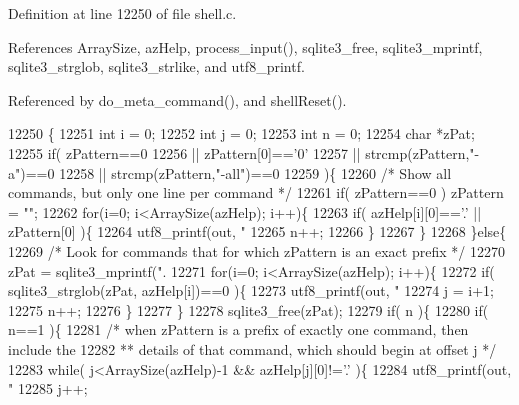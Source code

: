 Definition at line 12250 of file shell.\+c.



References Array\+Size, az\+Help, process\+\_\+input(), sqlite3\+\_\+free, sqlite3\+\_\+mprintf, sqlite3\+\_\+strglob, sqlite3\+\_\+strlike, and utf8\+\_\+printf.



Referenced by do\+\_\+meta\+\_\+command(), and shell\+Reset().


\begin{DoxyCode}
12250                                                     \{
12251   \textcolor{keywordtype}{int} i = 0;
12252   \textcolor{keywordtype}{int} j = 0;
12253   \textcolor{keywordtype}{int} n = 0;
12254   \textcolor{keywordtype}{char} *zPat;
12255   \textcolor{keywordflow}{if}( zPattern==0
12256    || zPattern[0]==\textcolor{charliteral}{'0'}
12257    || strcmp(zPattern,\textcolor{stringliteral}{"-a"})==0
12258    || strcmp(zPattern,\textcolor{stringliteral}{"-all"})==0
12259   )\{
12260     \textcolor{comment}{/* Show all commands, but only one line per command */}
12261     \textcolor{keywordflow}{if}( zPattern==0 ) zPattern = \textcolor{stringliteral}{""};
12262     \textcolor{keywordflow}{for}(i=0; i<ArraySize(azHelp); i++)\{
12263       \textcolor{keywordflow}{if}( azHelp[i][0]==\textcolor{charliteral}{'.'} || zPattern[0] )\{
12264         utf8_printf(out, \textcolor{stringliteral}{"%
12265         n++;
12266       \}
12267     \}
12268   \}\textcolor{keywordflow}{else}\{
12269     \textcolor{comment}{/* Look for commands that for which zPattern is an exact prefix */}
12270     zPat = sqlite3_mprintf(\textcolor{stringliteral}{".%
12271     \textcolor{keywordflow}{for}(i=0; i<ArraySize(azHelp); i++)\{
12272       \textcolor{keywordflow}{if}( sqlite3_strglob(zPat, azHelp[i])==0 )\{
12273         utf8_printf(out, \textcolor{stringliteral}{"%
12274         j = i+1;
12275         n++;
12276       \}
12277     \}
12278     sqlite3_free(zPat);
12279     \textcolor{keywordflow}{if}( n )\{
12280       \textcolor{keywordflow}{if}( n==1 )\{
12281         \textcolor{comment}{/* when zPattern is a prefix of exactly one command, then include the}
12282 \textcolor{comment}{        ** details of that command, which should begin at offset j */}
12283         \textcolor{keywordflow}{while}( j<ArraySize(azHelp)-1 && azHelp[j][0]!=\textcolor{charliteral}{'.'} )\{
12284           utf8_printf(out, \textcolor{stringliteral}{"%
12285           j++;
}}}}
\end{DoxyCode}
